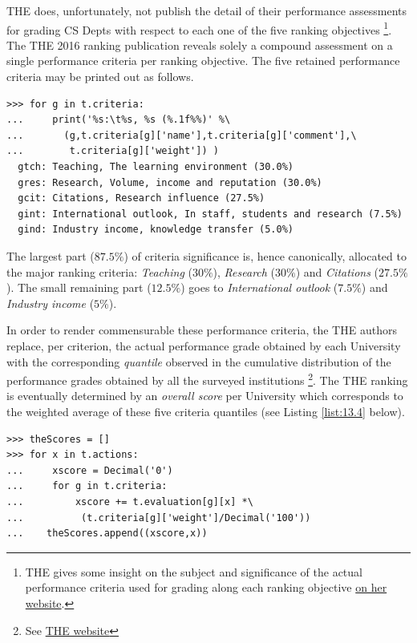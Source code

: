 THE does, unfortunately, not publish the detail of their performance assessments for grading CS Depts with respect to each one of the five ranking objectives \footnote{THE gives some insight on the subject and significance of the actual performance criteria used for grading along each ranking objective \href{https://www.timeshighereducation.com/sites/default/files/styles/article785xauto/public/wur\_graphic\_1.jpg?itok=XS6NcZfL}{on her website}.}. The THE 2016 ranking publication reveals solely a compound assessment on a single performance criteria per ranking objective. The five retained performance criteria may be printed out as follows.
\begin{lstlisting}
>>> for g in t.criteria:
...     print('%s:\t%s, %s (%.1f%%)' %\
...       (g,t.criteria[g]['name'],t.criteria[g]['comment'],\
...        t.criteria[g]['weight']) )  
  gtch:	Teaching, The learning environment (30.0%)
  gres:	Research, Volume, income and reputation (30.0%)
  gcit:	Citations, Research influence (27.5%)
  gint:	International outlook, In staff, students and research (7.5%)
  gind:	Industry income, knowledge transfer (5.0%)
\end{lstlisting}

The largest part ($87.5\%$) of criteria significance is, hence canonically, allocated to the major ranking criteria: \emph{Teaching} ($30\%$), \emph{Research} ($30\%$) and \emph{Citations} ($27.5\%$). The small remaining part ($12.5\%$) goes to \emph{International outlook} ($7.5\%$) and \emph{Industry income} ($5\%$).

In order to render commensurable these performance criteria, the THE authors replace, per criterion, the actual performance grade obtained by each University with the corresponding \emph{quantile} observed in the cumulative distribution of the performance grades obtained by all the surveyed institutions  \footnote{See \href{https://www.timeshighereducation.com/world-university-rankings/methodology-world-university-rankings-2016-2017}{THE website}}. The THE ranking is eventually determined by an \emph{overall score} per University which corresponds to the weighted average of these five criteria quantiles (see Listing \ref{list:13.4} below).       
\begin{lstlisting}[caption={Computing the THE overall scores},label=list:13.4]
>>> theScores = []
>>> for x in t.actions:
...     xscore = Decimal('0')
...     for g in t.criteria:
...         xscore += t.evaluation[g][x] *\
...          (t.criteria[g]['weight']/Decimal('100'))
...	   theScores.append((xscore,x))
\end{lstlisting}


